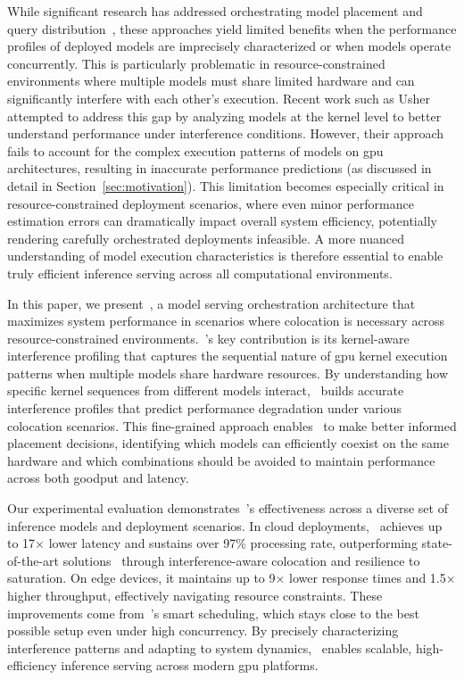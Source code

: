 While significant research has addressed orchestrating model placement and query distribution~\cite{2017clipper,olston2017tensorflowserving,gujarati2020servingdnnslikeclockwork}, these approaches yield limited benefits when the performance profiles of deployed models are imprecisely characterized or when models operate concurrently. This is particularly problematic in resource-constrained environments where multiple models must share limited hardware and can significantly interfere with each other's execution. Recent work such as Usher~\cite{shubha2024usher} attempted to address this gap by analyzing models at the kernel level to better understand performance under interference conditions. However, their approach fails to account for the complex execution patterns of models on \acrshort{gpu} architectures, resulting in inaccurate performance predictions (as discussed in detail in Section~\ref{sec:motivation}). This limitation becomes especially critical in resource-constrained deployment scenarios, where even minor performance estimation errors can dramatically impact overall system efficiency, potentially rendering carefully orchestrated deployments infeasible. A more nuanced understanding of model execution characteristics is therefore essential to enable truly efficient inference serving across all computational environments.

In this paper, we present~\roomie{}, a model serving orchestration architecture that maximizes system performance in scenarios where colocation is necessary across resource-constrained environments.~\roomie{}'s key contribution is its kernel-aware interference profiling that captures the sequential nature of \acrshort{gpu} kernel execution patterns when multiple models share hardware resources. By understanding how specific kernel sequences from different models interact,~\roomie{} builds accurate interference profiles that predict performance degradation under various colocation scenarios. This fine-grained approach enables~\roomie{} to make better informed placement decisions, identifying which models can efficiently coexist on the same hardware and which combinations should be avoided to maintain performance across both goodput and latency.

Our experimental evaluation demonstrates~\roomie{}'s effectiveness across a diverse set of inference models and deployment scenarios. In cloud deployments,~\roomie{} achieves up to 17× lower latency and sustains over 97\% processing rate, outperforming state-of-the-art solutions~\cite{shubha2024usher,francisco2021infaas} through interference-aware colocation and resilience to saturation. On edge devices, it maintains up to 9× lower response times and 1.5× higher throughput, effectively navigating resource constraints. These improvements come from~\roomie{}'s smart scheduling, which stays close to the best possible setup even under high concurrency. By precisely characterizing interference patterns and adapting to system dynamics,~\roomie{} enables scalable, high-efficiency inference serving across modern \acrshort{gpu} platforms.